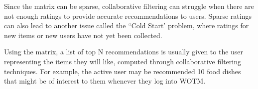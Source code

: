 Since the matrix can be sparse, collaborative filtering can struggle when there are not enough ratings to provide accurate recommendations to users. Sparse ratings can also lead to another issue called the ``Cold Start' problem, where ratings for new items or new users have not yet been collected. 





Using the matrix, a list of top N recommendations is usually given to the user representing the items they will like, computed through collaborative filtering techniques. For example, the active user may be recommended 10 food dishes that might be of interest to them whenever they log into WOTM.  




